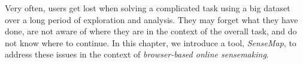 Very often, users get lost when solving a complicated task using a big dataset over a long period of exploration and analysis. They may forget what they have done, are not aware of where they are in the context of the overall task, and do not know where to continue. In this chapter, we introduce a tool, \emph{SenseMap}, to address these issues in the context of \emph{browser-based online sensemaking}.

%
%
%
%
